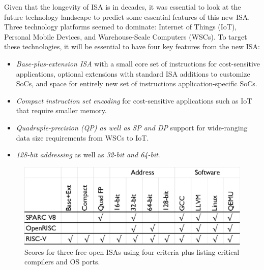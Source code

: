 \documentclass[journal]{IEEEtran}
\begin{document}
Given that the longevity of ISA is in decades, it was essential to look at the future technology landscape to predict some essential features of this new ISA. Three technology platforms seemed to dominate: Internet of Things (IoT), Personal Mobile Devices, and Warehouse-Scale Computers (WSCs). To target these technologies, it will be essential to have four key features from the new ISA:
\begin{itemize}
    \item \textit{Base-plus-extension ISA} with a small core set of instructions for cost-sensitive applications, optional extensions with standard ISA additions to customize SoCs, and space for entirely new set of instructions application-specific SoCs.
    \item \textit{Compact instruction set encoding} for cost-sensitive applications such as IoT that require smaller memory.
    \item \textit{Quadruple-precision (QP) as well as SP and DP} support for wide-ranging data size requirements from WSCs to IoT.
    \item \textit{128-bit addressing} as well as \textit{32-bit and 64-bit}.
\end{itemize}

\begin{figure}[htb]
    \centering
    \includegraphics[width=0.95\linewidth]{image-3FreeISA-Table.jpg}
    \caption{Scores for three free open ISAs using four criteria plus listing critical compilers and OS ports.}
    \label{fig:score}
\end{figure}
\end{document}
